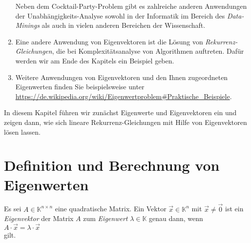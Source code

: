 \begin{enumerate}
      Neben dem Cocktail-Party-Problem gibt es zahlreiche anderen Anwendungen der
      Unabh\"angigkeits-Analyse sowohl in der Informatik im Bereich des 
      {\emph{\color{blue}Data-Minings}} als auch in vielen anderen Bereichen der Wissenschaft.
\item Eine andere Anwendung von Eigenvektoren ist die L\"osung von
      {\emph{\color{blue}Rekurrenz-Gleichungen}}, die bei Komplexit\"atsanalyse von Algorithmen
      auftreten.  Daf\"ur werden wir am Ende des Kapitels ein Beispiel geben.
\item Weitere Anwendungen von Eigenvektoren und den Ihnen zugeordneten Eigenwerten
      finden Sie beispielsweise unter 
      \\[0.2cm]
      \hspace*{1.3cm}
      \href{https://de.wikipedia.org/wiki/Eigenwertproblem#Praktische_Beispiele}{https://de.wikipedia.org/wiki/Eigenwertproblem\#Praktische\_Beispiele}.
\end{enumerate}
In diesem Kapitel f\"uhren wir zun\"achst Eigenwerte und Eigenvektoren ein und zeigen dann, wie sich 
lineare Rekurrenz-Gleichungen mit Hilfe von Eigenvektoren l\"osen lassen.  


\section{Definition und Berechnung von Eigenwerten}
\begin{Definition}[Eigenwert]
Es sei $A \in \mathbb{K}^{n \times n}$ eine quadratische Matrix.  Ein Vektor $\vec{x} \in \mathbb{K}^n$ mit $\vec{x} \not=\vec{0}$
ist ein {\emph{\color{blue}Eigenvektor}} der Matrix $A$ zum {\emph{\color{blue}Eigenwert}} $\lambda \in \mathbb{K}$ genau dann, wenn  
\\[0.2cm]
\hspace*{1.3cm}
$A \cdot \vec{x} = \lambda \cdot \vec{x}$
\\[0.2cm]
gilt.  \eoxs
\end{Definition}

